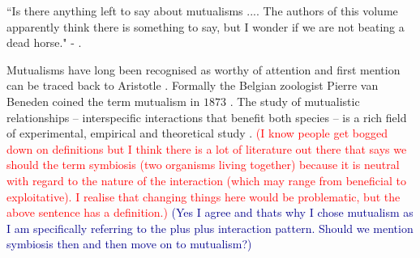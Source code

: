 \documentclass[12pt]{article}
\newcommand{\cha}[1]{\textcolor{darkblue}{(#1)}}
\newcommand{\paul}[1]{\textcolor{red}{(#1)}}
\begin{document}
``Is there anything left to say about mutualisms .... The authors of this volume apparently think there is something to say, but I wonder if we are not beating a dead horse." 
- \cite{janzen:bookchapter:1985}.

Mutualisms have long been recognised as worthy of attention and first mention can be traced back to Aristotle \citep{aristotle:book:350}.
Formally the Belgian zoologist Pierre van Beneden coined the term mutualism in $1873$ \citep{bronstein:book:2003}.
The study of mutualistic relationships -- interspecific interactions that benefit both species -- is a rich field of experimental, empirical and theoretical study 
\citep{boucher:book:1985,hinton:PTENHS:1951,wilson:AmNat:1983,bronstein:QRB:1994,poulin:JTB:1995,doebeli:PNAS:1998,noe:book:2001,johnstone:ECL:2002,pierce:ARE:2002,kiers:Nature:2003,bergstrom:PNAS:2003,hoeksema:AmNat:2003,bshary:ASB:2004,akcay:PRSB:2007,bshary:Nature:2008}.
\paul{I know people get bogged down on definitions but I think there is a lot of literature out there that says we should  the term symbiosis (two organisms living together) because it is neutral with regard to the nature of the interaction (which may range from beneficial to exploitative).  I realise that changing things here would be problematic, but the above sentence has a definition.}
\cha{Yes I agree and thats why I chose mutualism as I am specifically referring to the plus plus interaction pattern. Should we mention symbiosis then and then move on to mutualism?}
\end{document}
